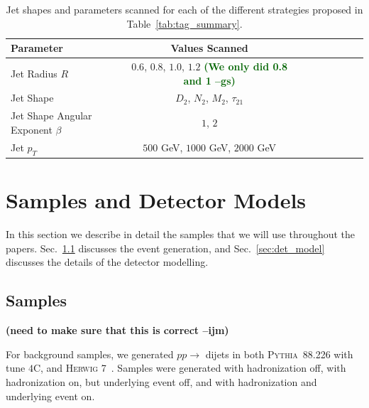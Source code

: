 \documentclass[11pt,letterpaper]{article}
\newcommand{\pythia}{\textsc{Pythia~8}\xspace}
\DeclareRobustCommand{\Sec}[1]{Sec.~\ref{#1}}
\DeclareRobustCommand{\Tab}[1]{Table~\ref{#1}}
\newcommand{\ijm}[1]{\textbf{\textcolor{llblue}{(#1 --ijm)}}}
\newcommand{\gs}[1]{\textbf{\textcolor{darkgreen}{(#1 --gs)}}}
\begin{document}
\begin{table}
\begin{center}
\begin{tabular}{| l | c | c |c |c|c|c |c|r| }
  \hline                       
  Parameter &  Values Scanned \\
  \hline
  Jet Radius $R$ &   $0.6$, $0.8$, $1.0$, $1.2$ \gs{We only did 0.8 and 1} \\
  Jet Shape  &   $D_2$, $N_2$, $M_2$, $\tau_{21}$  \\
  Jet Shape Angular Exponent $\beta$ &   $1$, $2$ \\
  Jet $p_T$ &   $500$ GeV, $1000$ GeV, $2000$ GeV  \\
  \hline  
\end{tabular}
\end{center}
\caption{
Jet shapes and parameters scanned for each of the different strategies proposed in \Tab{tab:tag_summary}.
}
\label{tab:params}
\end{table}












\section{Samples and Detector Models}\label{sec:samples}


In this section we describe in detail the samples that we will use throughout the papers. \Sec{sec:samples_sub} discusses the event generation, and \Sec{sec:det_model} discusses the details of the detector modelling. 

\subsection{Samples}\label{sec:samples_sub}

\ijm{need to make sure that this is correct}

For background samples, we generated $pp\to$ dijets in both \pythia{8.226} \cite{Sjostrand:2006za,Sjostrand:2007gs} with tune $4$C,   and \textsc{Herwig} 7~\cite{Bahr:2008pv,Bellm:2015jjp}. Samples were generated with hadronization off, with hadronization on, but underlying event off, and with hadronization and underlying event on.
\end{document}
